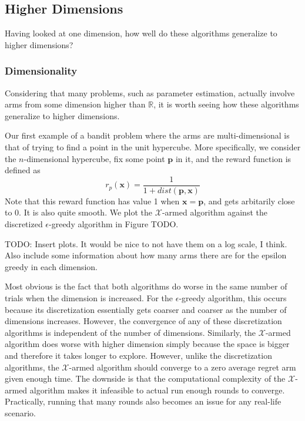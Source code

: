 \subsection{Higher Dimensions}
Having looked at one dimension, how well do these algorithms 
generalize to higher dimensions?

\subsubsection{Dimensionality}
Considering that many problems, such as parameter estimation, actually
involve arms from some dimension higher than $\mathbb{R}$, it is
worth seeing how these algorithms generalize to higher dimensions.

Our first example of a bandit problem where the arms are
multi-dimensional is that of trying to find a point in the unit hypercube.
More specifically, we consider the $n$-dimensional hypercube, fix some
point $\mathbf{p}$ in it, and the reward function is defined as
\[
	r_p(\mathbf{x}) = \frac{1}{1 + dist(\mathbf{p}, \mathbf{x})}
\]
Note that this reward function has value 1 when
$\mathbf{x} = \mathbf{p}$, and gets arbitarily close to 0.  It is
also quite smooth.  We plot the
$\mathcal{X}$-armed algorithm against the discretized $\epsilon$-greedy
algorithm in Figure TODO.

TODO: Insert plots.  It would be nice to not have them on a log
scale, I think.  Also include some information about how many arms there
are for the epsilon greedy in each dimension.

Most obvious is the fact that both algorithms do worse in the same number
of trials when the dimension is increased.  For the $\epsilon$-greedy
algorithm, this occurs because its discretization essentially gets
coarser and coarser as the number of dimensions increases.  However,
the convergence of any of these discretization algorithms is independent
of the number of dimensions.  Similarly,
the $\mathcal{X}$-armed algorithm does worse with higher dimension simply
because the space is bigger and therefore it takes longer to explore.
However, unlike the discretization algorithms, the $\mathcal{X}$-armed
algorithm should converge to a zero average regret arm given enough
time.  The downside is that the computational complexity of the
$\mathcal{X}$-armed algorithm makes it infeasible to actual run enough
rounds to converge.  Practically, running that many rounds also becomes
an issue for any real-life scenario. 

